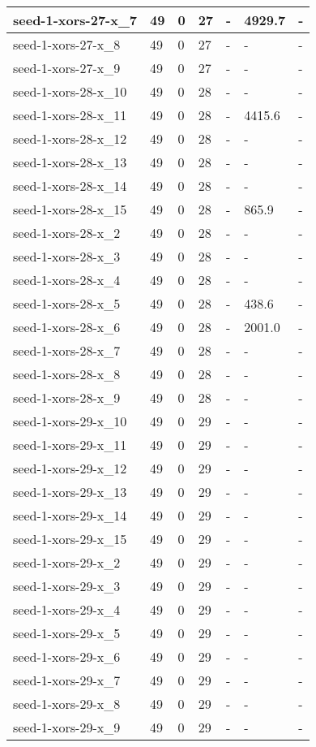 \begin{scriptsize}
\begin{longtable}{|p{5cm}|l|l|l|l|l|l|}
seed-1-xors-27-x\_7&49&0&27&-&4929.7&- \\ \hline 
seed-1-xors-27-x\_8&49&0&27&-&-&- \\ \hline 
seed-1-xors-27-x\_9&49&0&27&-&-&- \\ \hline 
seed-1-xors-28-x\_10&49&0&28&-&-&- \\ \hline 
seed-1-xors-28-x\_11&49&0&28&-&4415.6&- \\ \hline 
seed-1-xors-28-x\_12&49&0&28&-&-&- \\ \hline 
seed-1-xors-28-x\_13&49&0&28&-&-&- \\ \hline 
seed-1-xors-28-x\_14&49&0&28&-&-&- \\ \hline 
seed-1-xors-28-x\_15&49&0&28&-&865.9&- \\ \hline 
seed-1-xors-28-x\_2&49&0&28&-&-&- \\ \hline 
seed-1-xors-28-x\_3&49&0&28&-&-&- \\ \hline 
seed-1-xors-28-x\_4&49&0&28&-&-&- \\ \hline 
seed-1-xors-28-x\_5&49&0&28&-&438.6&- \\ \hline 
seed-1-xors-28-x\_6&49&0&28&-&2001.0&- \\ \hline 
seed-1-xors-28-x\_7&49&0&28&-&-&- \\ \hline 
seed-1-xors-28-x\_8&49&0&28&-&-&- \\ \hline 
seed-1-xors-28-x\_9&49&0&28&-&-&- \\ \hline 
seed-1-xors-29-x\_10&49&0&29&-&-&- \\ \hline 
seed-1-xors-29-x\_11&49&0&29&-&-&- \\ \hline 
seed-1-xors-29-x\_12&49&0&29&-&-&- \\ \hline 
seed-1-xors-29-x\_13&49&0&29&-&-&- \\ \hline 
seed-1-xors-29-x\_14&49&0&29&-&-&- \\ \hline 
seed-1-xors-29-x\_15&49&0&29&-&-&- \\ \hline 
seed-1-xors-29-x\_2&49&0&29&-&-&- \\ \hline 
seed-1-xors-29-x\_3&49&0&29&-&-&- \\ \hline 
seed-1-xors-29-x\_4&49&0&29&-&-&- \\ \hline 
seed-1-xors-29-x\_5&49&0&29&-&-&- \\ \hline 
seed-1-xors-29-x\_6&49&0&29&-&-&- \\ \hline 
seed-1-xors-29-x\_7&49&0&29&-&-&- \\ \hline 
seed-1-xors-29-x\_8&49&0&29&-&-&- \\ \hline 
seed-1-xors-29-x\_9&49&0&29&-&-&- \\ \hline 

\end{longtable}
\end{scriptsize}
